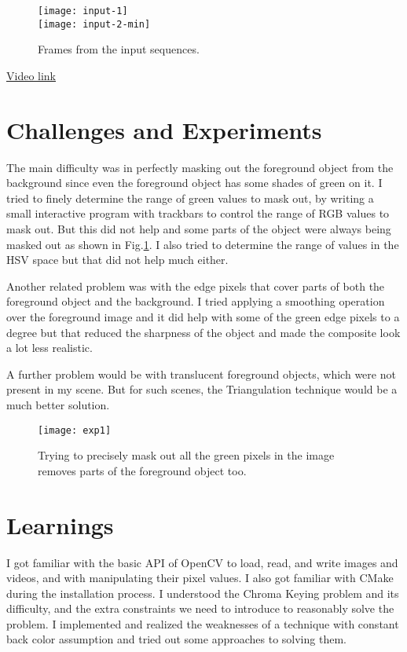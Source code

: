 \documentclass[a4paper,11pt]{article}
\begin{document}
   \begin{figure}[H]
   \centering
   \texttt{[image: input-1]}\\
   \vspace{2em}
   \texttt{[image: input-2-min]}
   \caption{Frames from the input sequences.}
  \end{figure}
  
 \href{https://drive.google.com/file/d/1Wk-gvBq0WLhlcZk-SBRSdigxSylmUiRm/view?usp=sharing}{Video link}

  \section{Challenges and Experiments}
  The main difficulty was in perfectly masking out the foreground object from the background since even the foreground object has some shades of green on it. I tried to finely determine the range of green values to mask out, by writing a small interactive program with trackbars to control the range of RGB values to mask out. But this did not help and some parts of the object were always being masked out as shown in Fig.\ref{fig:exp1}. I also tried to determine the range of values in the HSV space but that did not help much either.
  
  Another related problem was with the edge pixels that cover parts of both the foreground object and the background. I tried applying a smoothing operation over the foreground image and it did help with some of the green edge pixels to a degree but that reduced the sharpness of the object and made the composite look a lot less realistic.
  
  A further problem would be with translucent foreground objects, which were not present in my scene. But for such scenes, the Triangulation technique would be a much better solution.
  
  \begin{figure}[H]
   \centering
   \texttt{[image: exp1]}
   \caption{Trying to precisely mask out all the green pixels in the image removes parts of the foreground object too.}
   \label{fig:exp1}
  \end{figure}

  
  \section{Learnings}
  I got familiar with the basic API of OpenCV to load, read, and write images and videos, and with manipulating their pixel values. I also got familiar with CMake during the installation process.
  I understood the Chroma Keying problem and its difficulty, and the extra constraints we need to introduce to reasonably solve the problem. I implemented and realized the weaknesses of a technique with constant back color assumption and tried out some approaches to solving them. 
\end{document}

